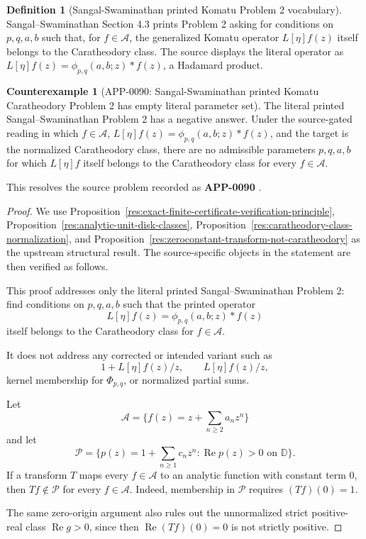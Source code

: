 \documentclass[11pt]{article}
\numberwithin{equation}{section}
\theoremstyle{definition}
\newtheorem{definition}{Definition}[section]
\newtheorem{counterexample}[theorem]{Counterexample}
\theoremstyle{remark}
\newcommand{\1}{\mathbf 1}
\begin{document}
\begin{definition}[Sangal-Swaminathan printed Komatu Problem 2 vocabulary]
\label{res:sangalswaminathan-komatu-problem2-literal}
Sangal--Swaminathan Section 4.3 prints Problem 2 asking for conditions on \(p,q,a,b\) such that, for \(f\in\mathcal A\), the generalized Komatu operator \(L[\eta]f(z)\) itself belongs to the Caratheodory class. The source displays the literal operator as \(L[\eta]f(z)=\phi_{p,q}(a,b;z)*f(z)\), a Hadamard product.
\end{definition}

\begin{counterexample}[APP-0090: Sangal-Swaminathan printed Komatu Caratheodory Problem 2 has empty literal parameter set]
\label{res:komatu-caratheodory-problem2-literal-refuted}
The literal printed Sangal--Swaminathan Problem 2 has a negative answer. Under the source-gated reading in which \(f\in\mathcal A\), \(L[\eta]f(z)=\phi_{p,q}(a,b;z)*f(z)\), and the target is the normalized Caratheodory class, there are no admissible parameters \(p,q,a,b\) for which \(L[\eta]f\) itself belongs to the Caratheodory class for every \(f\in\mathcal A\).



This resolves the source problem recorded as \textbf{APP-0090} \cite{app-app-0090-source}.
\end{counterexample}

\begin{proof}
We use Proposition~\ref{res:exact-finite-certificate-verification-principle}, Proposition~\ref{res:analytic-unit-disk-classes}, Proposition~\ref{res:caratheodory-class-normalization}, and Proposition~\ref{res:zeroconstant-transform-not-caratheodory} as the upstream structural result. The source-specific objects in the statement are then verified as follows.

This proof addresses only the literal printed Sangal--Swaminathan Problem 2:
find conditions on \(p,q,a,b\) such that the printed operator
\[
L[\eta]f(z)=\phi_{p,q}(a,b;z)*f(z)
\]
itself belongs to the Caratheodory class for \(f\in\mathcal A\).

It does not address any corrected or intended variant such as
\[
1+L[\eta]f(z)/z,\qquad L[\eta]f(z)/z,
\]
kernel membership for \(\Phi_{p,q}\), or normalized partial sums.

Let
\[
\mathcal A=\{f(z)=z+\sum_{n\ge 2}a_nz^n\}
\]
and let
\[
\mathcal P=\{p(z)=1+\sum_{n\ge 1}c_nz^n:\operatorname{Re}p(z)>0
\text{ on }\mathbb D\}.
\]
If a transform \(T\) maps every \(f\in\mathcal A\) to an analytic function
with constant term \(0\), then \(Tf\notin\mathcal P\) for every
\(f\in\mathcal A\). Indeed, membership in \(\mathcal P\) requires
\((Tf)(0)=1\).

The same zero-origin argument also rules out the unnormalized strict
positive-real class \(\operatorname{Re}g>0\), since then
\(\operatorname{Re}(Tf)(0)=0\) is not strictly positive.
\end{proof}
\end{document}
